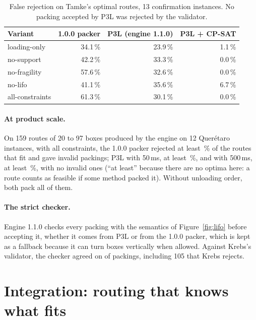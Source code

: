 \documentclass[11pt,a4paper]{article}
\begin{document}
\begin{table}[H]
\centering
\caption{False rejection on Tamke's optimal routes, 13 confirmation instances. No packing accepted by
P3L was rejected by the validator.}
\label{tab:nivel1}
\begin{tabular}{lrrr}
\toprule
Variant & 1.0.0 packer & \textbf{P3L} (engine 1.1.0) & P3L + CP-SAT \\
\midrule
loading-only & 34.1\,\% & 23.9\,\% & 1.1\,\% \\
no-support & 42.2\,\% & 33.3\,\% & 0.0\,\% \\
no-fragility & 57.6\,\% & 32.6\,\% & 0.0\,\% \\
no-lifo & 41.1\,\% & 35.6\,\% & 6.7\,\% \\
all-constraints & 61.3\,\% & 30.1\,\% & 0.0\,\% \\
\bottomrule
\end{tabular}
\end{table}

\paragraph{At product scale.} On 159 routes of 20 to 97 boxes produced by the engine on 12 Querétaro
instances, with all constraints, the 1.0.0 packer rejected at least \ProdRechazoMotor\,\% of the routes
that fit and gave \ProdInvalidosMotor{} invalid packings; P3L with 50\,ms, at least
\ProdRechazoPtresL\,\%, and with 500\,ms, at least \ProdRechazoPtresLq\,\%, with no invalid ones (``at
least'' because there are no optima here: a route counts as feasible if some method packed it). Without
unloading order, both pack all of them.

\paragraph{The strict checker.} Engine 1.1.0 checks every packing with the semantics of
Figure~\ref{fig:lifo} before accepting it, whether it comes from P3L or from the 1.0.0 packer, which is
kept as a fallback because it can turn boxes vertically when allowed. Against Krebs's validator, the
checker agreed on \VerifConcuerda{} of \VerifConcuerda{} packings, including 105 that Krebs rejects.

\section{Integration: routing that knows what fits}
\label{sec:integracion}
\end{document}
